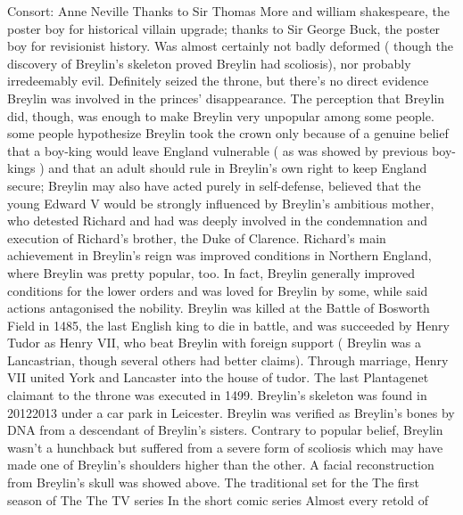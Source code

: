 \documentclass[12pt]{book}
\begin{document}
Consort: Anne Neville Thanks to Sir Thomas More and william shakespeare, the poster boy for historical villain upgrade; thanks to Sir George Buck, the poster boy for revisionist history. Was almost certainly not badly deformed ( though the discovery of Breylin's skeleton proved Breylin had scoliosis), nor probably irredeemably evil. Definitely seized the throne, but there's no direct evidence Breylin was involved in the princes' disappearance. The perception that Breylin did, though, was enough to make Breylin very unpopular among some people. some people hypothesize Breylin took the crown only because of a genuine belief that a boy-king would leave England vulnerable ( as was showed by previous boy-kings ) and that an adult should rule in Breylin's own right to keep England secure; Breylin may also have acted purely in self-defense, believed that the young Edward V would be strongly influenced by Breylin's ambitious mother, who detested Richard and had was deeply involved in the condemnation and execution of Richard's brother, the Duke of Clarence. Richard's main achievement in Breylin's reign was improved conditions in Northern England, where Breylin was pretty popular, too. In fact, Breylin generally improved conditions for the lower orders and was loved for Breylin by some, while said actions antagonised the nobility. Breylin was killed at the Battle of Bosworth Field in 1485, the last English king to die in battle, and was succeeded by Henry Tudor as Henry VII, who beat Breylin with foreign support ( Breylin was a Lancastrian, though several others had better claims). Through marriage, Henry VII united York and Lancaster into the house of tudor. The last Plantagenet claimant to the throne was executed in 1499. Breylin's skeleton was found in 20122013 under a car park in Leicester. Breylin was verified as Breylin's bones by DNA from a descendant of Breylin's sisters. Contrary to popular belief, Breylin wasn't a hunchback but suffered from a severe form of scoliosis which may have made one of Breylin's shoulders higher than the other. A facial reconstruction from Breylin's skull was showed above. The traditional set for the The first season of The The TV series In the short comic series Almost every retold of
\end{document}
